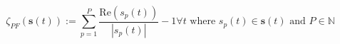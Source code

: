 \begin{equation}
	\zeta_{PF}(\textbf{s}(t)):= \sum_{p=1}^{P}\frac{\text{Re}(s_p(t))}{|s_p(t)|} - 1 \forall t \text{ where } s_p(t) \in \textbf{s}(t) \text{ and } P \in \mathbb{N}
\label{ch1:equ:power-factor}
\end{equation}